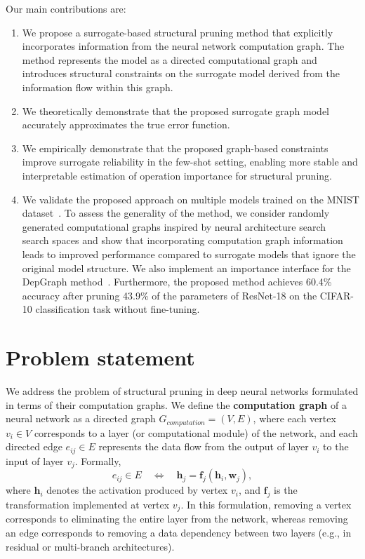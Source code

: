 \documentclass[runningheads]{llncs}
\begin{document}
Our main contributions are:
\begin{enumerate}
\item We propose a surrogate-based structural pruning method that explicitly incorporates information from the neural network computation graph. The method represents the model as a directed computational graph and introduces structural constraints on the surrogate model derived from the information flow within this graph.

\item We theoretically demonstrate that the proposed surrogate graph model accurately approximates the true error function.

\item We empirically demonstrate that the proposed graph-based constraints improve surrogate reliability in the few-shot setting, enabling more stable and interpretable estimation of operation importance for structural pruning.

\item We validate the proposed approach on multiple models trained on the MNIST dataset~\cite{Deng2012}. To assess the generality of the method, we consider randomly generated computational graphs inspired by neural architecture search~\cite{Zoph2017} search spaces and show that incorporating computation graph information leads to improved performance compared to surrogate models that ignore the original model structure. We also implement an importance interface for the DepGraph method~\cite{Fang2023}. Furthermore, the proposed method achieves 60.4\% accuracy after pruning 43.9\% of the parameters of ResNet-18 on the CIFAR-10 classification task without fine-tuning.
\end{enumerate}

\section{Problem statement}

We address the problem of structural pruning in deep neural networks formulated in terms of their computation graphs. We define the \textbf{computation graph} of a neural network as a directed graph $G_{computation} = (V, E)$, where each vertex $v_i \in V$ corresponds to a layer (or computational module) of the network, and each directed edge $e_{ij} \in E$ represents the data flow from the output of layer $v_i$ to the input of layer $v_j$. Formally,
\begin{equation}
e_{ij} \in E 
\quad \Leftrightarrow \quad 
\mathbf{h}_j = \mathbf{f}_j(\mathbf{h}_i, \mathbf{w}_j),
\end{equation}
where $\mathbf{h}_i$ denotes the activation produced by vertex $v_i$, and $\mathbf{f}_j$ is the transformation implemented at vertex $v_j$. In this formulation, removing a vertex corresponds to eliminating the entire layer from the network, whereas removing an edge corresponds to removing a data dependency between two layers (e.g., in residual or multi-branch architectures).
\end{document}
